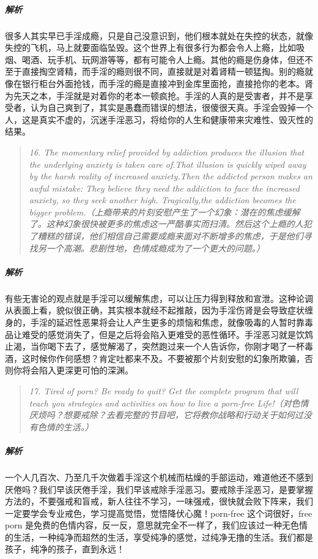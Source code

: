 \subparagraph{解析} 很多人其实早已手淫成瘾，只是自己没意识到，他们根本就处在失控的状态，就像失控的飞机，马上就要面临坠毁。这个世界上有很多行为都会令人上瘾，比如吸烟、喝酒、玩手机、玩网游等等，都有可能令人上瘾。其他的瘾是伤身体，但还不至于直接掏空肾精，而手淫的瘾则很不同，直接就是对着肾精一顿猛掏。别的瘾就像在银行柜台外面抢钱，而手淫的瘾是直接冲到金库里面抢，直接抢你的老本。肾为先天之本，手淫就是对着你的老本一顿疯抢。手淫的人真的是受害者，并不是享受者，认为自己爽到了，其实是愚蠢而错误的想法，很傻很天真。手淫会毁掉一个人，这是真实不虚的，沉迷手淫恶习，将给你的人生和健康带来灾难性、毁灭性的结果。

\begin{quote}\it
    16. The momentary relief provided by addiction produces the illusion that the underlying anxiety is taken care of.That illusion is quickly wiped away by the harsh reality of increased anxiety.Then the addicted person makes an awful mistake: They believe they need the addiction to face the increased anxiety, so they seek another high. Tragically,the addiction becomes the bigger problem.（上瘾带来的片刻安慰产生了一个幻象：潜在的焦虑缓解了。这种幻象很快被更多的焦虑这一严酷事实而扫清。然后这个上瘾的人犯了糟糕的错误，他们相信自己需要成瘾来面对不断增多的焦虑，于是他们寻找另一个高潮。悲剧性地，色情成瘾成为了一个更大的问题。）
\end{quote}

\subparagraph{解析} 有些无害论的观点就是手淫可以缓解焦虑，可以让压力得到释放和宣泄。这种论调从表面上看，貌似很正确，其实根本就经不起推敲，因为手淫伤肾是会导致症状缠身的，手淫的延迟性恶果将会让人产生更多的烦恼和焦虑，就像吸毒的人暂时靠毒品让难受的感觉消失了，但是之后将会陷入更难受的恶性循环。手淫恶习就是饮鸩止渴，当你喝下去了，感觉解渴了，突然跑过来一个人告诉你，你刚才喝了一杯毒酒，这时候你作何感想？肯定吐都来不及。不要被那个片刻安慰的幻象所欺骗，否则你将会陷入更深更可怕的深渊。

\begin{quote}\it
    17. Tired of porn? Be ready to quit? Get the complete program that will teach you strategies and activities on how to live a porn-free Life!（对色情厌烦吗？想要戒除？去看完整的节目吧，它将教你战略和行动关于如何过没有色情的生活。）
\end{quote}

\subparagraph{解析} 一个人几百次、乃至几千次做着手淫这个机械而枯燥的手部运动，难道他还不感到厌倦吗？我们早该厌倦手淫，我们早该戒除手淫恶习。要戒除手淫恶习，是要掌握方法的，不要强戒和盲戒，新人往往不学习，一味强戒，很快就会败下阵来，我们一定要学会专业戒色，学习提高觉悟，觉悟降伏心魔！porn-free 这个词很好，free porn 是免费的色情内容，反一反，意思就完全不一样了，我们应该过一种无色情的生活，一种纯净而超然的生活，享受纯净的感觉，过纯净无撸的生活。我们都是孩子，纯净的孩子，直到永远！

